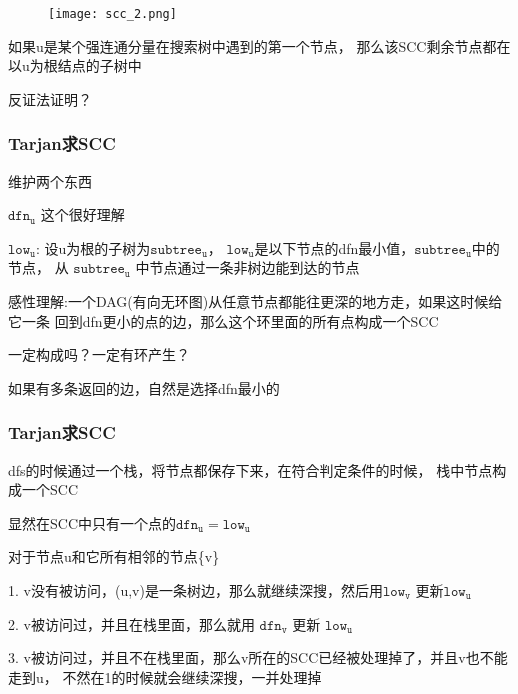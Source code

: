 \documentclass{beamer}
\begin{document}
  \begin{frame}
    \begin{figure}
      \texttt{[image: scc\_2.png]}
    \end{figure}

    \pause
    
    如果u是某个强连通分量在搜索树中遇到的第一个节点，
    那么该SCC剩余节点都在以u为根结点的子树中
    
    \pause

    \vspace*{1\baselineskip}

    反证法证明？

  \end{frame}

  \begin{frame}
    \frametitle{Tarjan求SCC}
    维护两个东西

    $\mathtt{dfn_u}$ 这个很好理解

    $\mathtt{low_u}$: 设u为根的子树为$\mathtt{subtree_u}$，
    $\mathtt{low_u}$是以下节点的dfn最小值，$\mathtt{subtree_u}$中的节点，
    从 $\mathtt{subtree_u}$ 中节点通过一条非树边能到达的节点
    
    \vspace*{1\baselineskip}

    \pause

    感性理解:一个DAG(有向无环图)从任意节点都能往更深的地方走，如果这时候给它一条
    回到dfn更小的点的边，那么这个环里面的所有点构成一个SCC

    \pause

    \vspace*{1\baselineskip}

    一定构成吗？一定有环产生？

    \vspace*{1\baselineskip}

    如果有多条返回的边，自然是选择dfn最小的
  \end{frame}

  \begin{frame}
    \frametitle{Tarjan求SCC}
    dfs的时候通过一个栈，将节点都保存下来，在符合判定条件的时候，
    栈中节点构成一个SCC

    显然在SCC中只有一个点的$\mathtt{dfn_u=low_u}$

    \vspace*{1\baselineskip}
    
    对于节点u和它所有相邻的节点\{v\}

    1. v没有被访问，(u,v)是一条树边，那么就继续深搜，然后用$\mathtt{low_v}$
    更新$\mathtt{low_u}$

    2. v被访问过，并且在栈里面，那么就用 $\mathtt{dfn_v}$ 更新 $\mathtt{low_u}$

    3. v被访问过，并且不在栈里面，那么v所在的SCC已经被处理掉了，并且v也不能走到u，
    不然在1的时候就会继续深搜，一并处理掉

  \end{frame}
\end{document}

